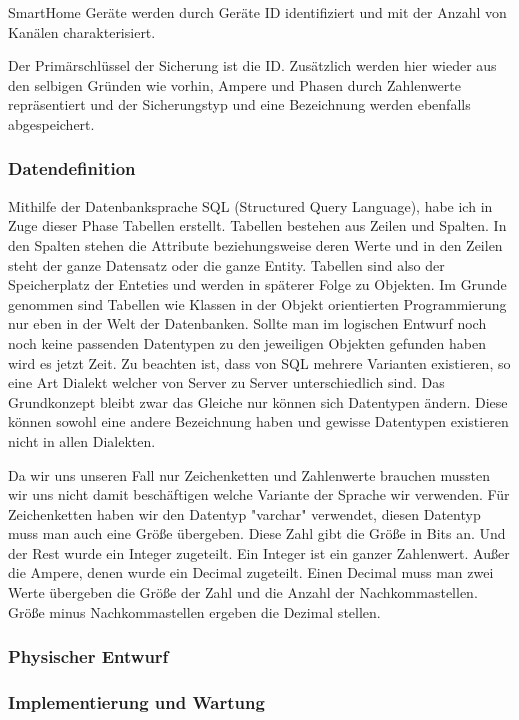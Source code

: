 \begin{flushleft}
SmartHome Geräte werden durch Geräte ID identifiziert und mit der Anzahl von Kanälen charakterisiert.

Der Primärschlüssel der Sicherung ist die ID. Zusätzlich werden hier wieder aus den selbigen Gründen wie vorhin, Ampere und Phasen durch Zahlenwerte repräsentiert und der Sicherungstyp und eine Bezeichnung werden ebenfalls abgespeichert. 



\subsubsection{Datendefinition}

Mithilfe der Datenbanksprache SQL (Structured Query Language), habe ich in Zuge dieser Phase Tabellen erstellt. Tabellen bestehen aus Zeilen und Spalten. In den Spalten stehen die Attribute beziehungsweise deren Werte und in den Zeilen steht der ganze Datensatz oder die ganze Entity. Tabellen sind also der Speicherplatz der Enteties und werden in späterer Folge zu Objekten. Im Grunde genommen sind Tabellen wie Klassen in der Objekt orientierten Programmierung nur eben in der Welt der Datenbanken. 
Sollte man im logischen Entwurf noch noch keine passenden Datentypen zu den jeweiligen Objekten gefunden haben wird es jetzt Zeit. Zu beachten ist, dass von SQL mehrere Varianten existieren, so eine Art Dialekt welcher von Server zu Server unterschiedlich sind. Das Grundkonzept bleibt zwar das Gleiche nur können sich Datentypen ändern. Diese können sowohl eine andere Bezeichnung haben und gewisse Datentypen existieren nicht in allen Dialekten.

Da wir uns unseren Fall nur Zeichenketten und Zahlenwerte brauchen mussten wir uns nicht damit beschäftigen welche Variante der Sprache wir verwenden. Für Zeichenketten haben wir den Datentyp "varchar" verwendet, diesen Datentyp muss man auch eine Größe übergeben. Diese Zahl gibt die Größe in Bits an. Und der Rest wurde ein Integer zugeteilt. Ein Integer ist ein ganzer Zahlenwert. Außer die Ampere, denen wurde ein Decimal zugeteilt. Einen Decimal muss man zwei Werte übergeben die Größe der Zahl und die Anzahl der Nachkommastellen. Größe minus Nachkommastellen ergeben die Dezimal stellen.

\subsubsection{Physischer Entwurf}
\subsubsection{Implementierung und Wartung}


\end{flushleft}

